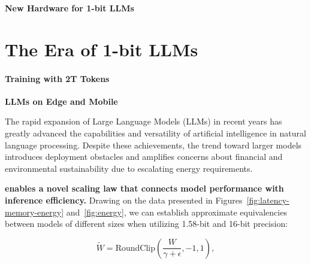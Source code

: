 \textbf{New Hardware for 1-bit LLMs}

\section{The Era of 1-bit LLMs}

\paragraph{Training with 2T Tokens}

\textbf{LLMs on Edge and Mobile}

The rapid expansion of Large Language Models (LLMs) in recent years has greatly advanced the capabilities and versatility of artificial intelligence in natural language processing. Despite these achievements, the trend toward larger models introduces deployment obstacles and amplifies concerns about financial and environmental sustainability due to escalating energy requirements.

\textbf{ enables a novel scaling law that connects model performance with inference efficiency.} Drawing on the data presented in Figures~\ref{fig:latency-memory-energy} and~\ref{fig:energy}, we can establish approximate equivalencies between models of different sizes when utilizing 1.58-bit and 16-bit precision:

\begin{equation}
    \widetilde{W} = \mathrm{RoundClip}(\frac{W}{\gamma + \epsilon}, -1, 1),
\end{equation}


\begin{abstract}
Emerging work, notably BitNet~\cite{bitnet}, is ushering in a paradigm shift toward 1-bit Large Language Models (LLMs). This paper presents a 1-bit LLM variant named \textbf{}, in which each individual model parameter takes on a ternary value from the set \{-1, 0, 1\}. This architecture achieves performance parity—both in terms of perplexity and downstream task effectiveness—with full-precision Transformer LLMs (utilizing FP16 or BF16), given the same parameter count and training data, while greatly reducing resource costs in latency, memory usage, throughput, and energy expenditure. More fundamentally, the 1.58-bit LLM establishes a novel scaling principle and methodology for training advanced LLMs that unite high efficiency with superior performance. Additionally, it paves the way for a new computational model and motivates the development of bespoke hardware architectures tuned for 1-bit LLMs.
\end{abstract}

